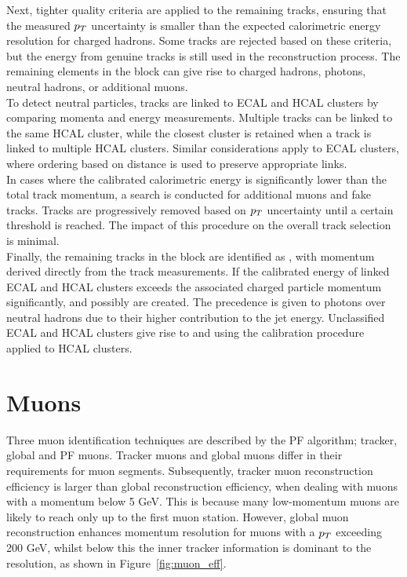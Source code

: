 Next, tighter quality criteria are applied to the remaining tracks, ensuring that the measured $p_{T}$ uncertainty is smaller than the expected calorimetric energy resolution for charged hadrons. 
Some tracks are rejected based on these criteria, but the energy from genuine tracks is still used in the reconstruction process. 
The remaining elements in the block can give rise to charged hadrons, photons, neutral hadrons, or additional muons. \\

To detect neutral particles, tracks are linked to \ac{ECAL} and \ac{HCAL} clusters by comparing momenta and energy measurements. 
Multiple tracks can be linked to the same \ac{HCAL} cluster, while the closest cluster is retained when a track is linked to multiple \ac{HCAL} clusters. 
Similar considerations apply to \ac{ECAL} clusters, where ordering based on distance is used to preserve appropriate links. \\

In cases where the calibrated calorimetric energy is significantly lower than the total track momentum, a search is conducted for additional muons and fake tracks. 
Tracks are progressively removed based on $p_{T}$ uncertainty until a certain threshold is reached. 
The impact of this procedure on the overall track selection is minimal. \\

Finally, the remaining tracks in the block are identified as , with momentum derived directly from the track measurements. 
If the calibrated energy of linked \ac{ECAL} and \ac{HCAL} clusters exceeds the associated charged particle momentum significantly,  and possibly  are created. 
The precedence is given to photons over neutral hadrons due to their higher contribution to the jet energy. 
Unclassified \ac{ECAL} and \ac{HCAL} clusters give rise to  and  using the calibration procedure applied to \ac{HCAL} clusters.

\section{Muons}

Three muon identification techniques are described by the \ac{PF} algorithm; tracker, global and \ac{PF} muons.
Tracker muons and global muons differ in their requirements for muon segments. 
Subsequently, tracker muon reconstruction efficiency is larger than global reconstruction efficiency, when dealing with muons with a momentum below 5 GeV. 
This is because many low-momentum muons are likely to reach only up to the first muon station. 
However, global muon reconstruction enhances momentum resolution for muons with a $p_{T}$ exceeding 200 GeV, whilst below this the inner tracker information is dominant to the resolution, as shown in Figure~\ref{fig:muon_eff}. \\

